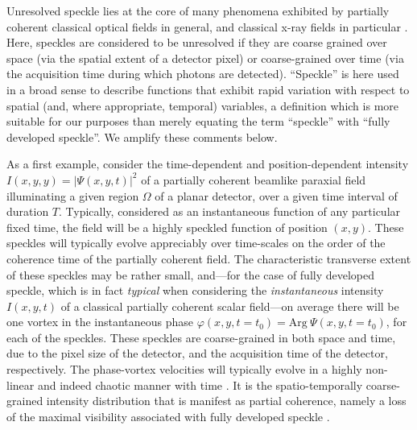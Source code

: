 \documentclass[%
 reprint,
 amsmath,amssymb,
 aps,
]{revtex4-1}
\begin{document}
Unresolved speckle lies at the core of many phenomena exhibited by partially coherent classical optical fields in general, and classical x-ray fields in particular \cite{Nugent2003,paganin_book,Nesterets2008}.  Here, speckles are considered to be unresolved if they are coarse grained over space (via the spatial extent of a detector pixel) or coarse-grained over time (via the acquisition time during which photons are detected).  ``Speckle'' is here used in a broad sense to describe functions that exhibit rapid variation with respect to spatial (and, where appropriate, temporal) variables, a definition which is more suitable for our purposes than merely equating the term ``speckle'' with ``fully developed speckle''. We amplify these comments below.  

As a first example, consider the time-dependent and position-dependent intensity $I(x,y,y)=|\Psi(x,y,t)|^2$ of a partially coherent beamlike paraxial field illuminating a given region $\Omega$ of a planar detector, over a given time interval of duration $T$.  Typically, considered as an instantaneous function of any particular fixed time, the field will be a highly speckled function of position $(x,y)$.  These speckles will typically evolve appreciably over time-scales on the order of the coherence time of the partially coherent field.  The characteristic transverse extent of these speckles may be rather small, and---for the case of fully developed speckle, which is in fact {\em typical} when considering the {\em instantaneous} intensity $I(x,y,t)$ of a classical partially coherent scalar field---on average there will be one vortex in the instantaneous phase $\varphi(x,y,t=t_0)=\textrm{Arg} ~\Psi(x,y,t=t_0)$, for each of the speckles.  These speckles are coarse-grained in both space and time, due to the pixel size of the detector, and the acquisition time of the detector, respectively.  The phase-vortex velocities will typically evolve in a highly non-linear and indeed chaotic manner with time \cite{Alperin2019}. It is the spatio-temporally coarse-grained intensity distribution that is manifest as partial coherence, namely a loss of the maximal visibility associated with fully developed speckle \cite{paganin_book}.  
\end{document}
